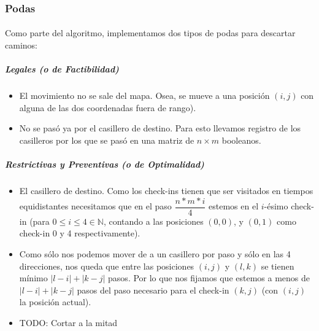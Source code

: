 \documentclass[./main.tex]{subfiles}
\begin{document}
\subsubsection{Podas}
\label{sec:ej1-podas}

\paragraph{} Como parte del algoritmo, implementamos dos tipos de podas para descartar caminos:
\subparagraph{Legales (o de Factibilidad)}
\begin{itemize}
  \item El movimiento no se sale del mapa. Osea, se mueve a una posición \((i, j)\) con alguna de las dos coordenadas fuera de rango).
  \item No se pasó ya por el casillero de destino. Para esto llevamos registro de los casilleros por los que se pasó en una matriz de \(n \times m\) booleanos.
\end{itemize}

\subparagraph{Restrictivas y Preventivas (o de Optimalidad)}
\begin{itemize}
  \item El casillero de destino. Como los check-ins tienen que ser visitados en tiempos equidistantes necesitamos que en el paso \(\dfrac{n*m*i}{4}\) estemos en el \(i\)-ésimo check-in (para \(0\leq i \leq 4 \in \mathbb{N}\), contando a las posiciones \((0, 0)\), y \((0, 1)\) como check-in 0 y 4 respectivamente).
  \item Como sólo nos podemos mover de a un casillero por paso y sólo en las 4 direcciones, nos queda que entre las posiciones \((i, j)\) y \((l, k)\) se tienen mínimo \(|l-i| + |k-j|\) pasos. Por lo que nos fijamos que estemos a menos de \(|l-i| + |k-j|\) pasos del paso necesario para el check-in \((k, j)\) (con \((i, j)\) la posición actual). %
  \item TODO: Cortar a la mitad
\end{itemize}
\end{document}
